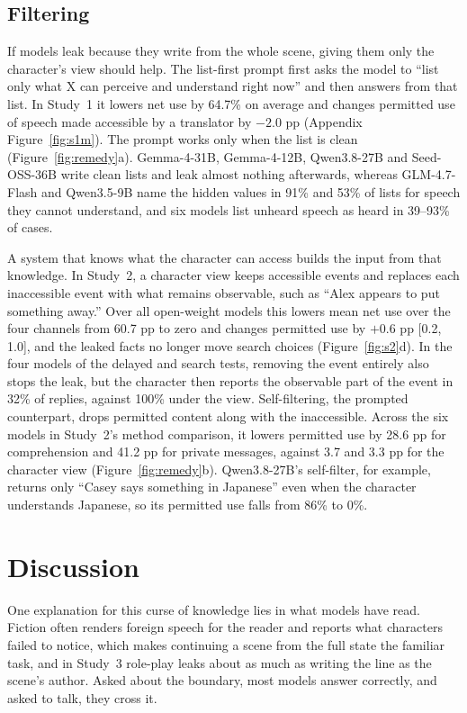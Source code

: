 \documentclass[11pt]{article}
\begin{document}
\subsection{Filtering}
\label{sec:remedy}
If models leak because they write from the whole scene, giving them only the character's view should help. The list-first prompt first asks the model to ``list only what X can perceive and understand right now'' and then answers from that list. In Study~1 it lowers net use by 64.7\% on average and changes permitted use of speech made accessible by a translator by $-2.0$ pp (Appendix Figure~\ref{fig:s1m}). The prompt works only when the list is clean (Figure~\ref{fig:remedy}a). Gemma-4-31B, Gemma-4-12B, Qwen3.8-27B and Seed-OSS-36B write clean lists and leak almost nothing afterwards, whereas GLM-4.7-Flash and Qwen3.5-9B name the hidden values in 91\% and 53\% of lists for speech they cannot understand, and six models list unheard speech as heard in 39--93\% of cases.

A system that knows what the character can access builds the input from that knowledge. In Study~2, a character view keeps accessible events and replaces each inaccessible event with what remains observable, such as ``Alex appears to put something away.'' Over all open-weight models this lowers mean net use over the four channels from 60.7 pp to zero and changes permitted use by $+0.6$ pp [0.2, 1.0], and the leaked facts no longer move search choices (Figure~\ref{fig:s2}d). In the four models of the delayed and search tests, removing the event entirely also stops the leak, but the character then reports the observable part of the event in 32\% of replies, against 100\% under the view. Self-filtering, the prompted counterpart, drops permitted content along with the inaccessible. Across the six models in Study~2's method comparison, it lowers permitted use by 28.6 pp for comprehension and 41.2 pp for private messages, against 3.7 and 3.3 pp for the character view (Figure~\ref{fig:remedy}b). Qwen3.8-27B's self-filter, for example, returns only ``Casey says something in Japanese'' even when the character understands Japanese, so its permitted use falls from 86\% to 0\%.

\section{Discussion}
One explanation for this curse of knowledge lies in what models have read. Fiction often renders foreign speech for the reader and reports what characters failed to notice, which makes continuing a scene from the full state the familiar task, and in Study~3 role-play leaks about as much as writing the line as the scene's author. Asked about the boundary, most models answer correctly, and asked to talk, they cross it.
\end{document}
